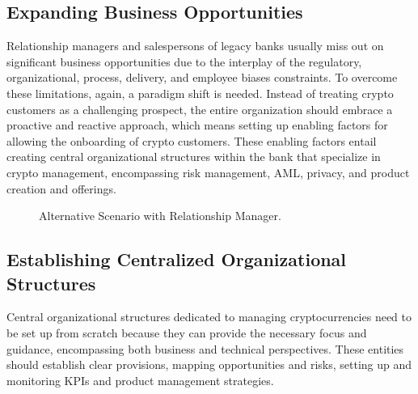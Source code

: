 \documentclass[letterpaper,10pt,english]{jupyterBook}
\let\sphinxpxdimen\pdfpxdimen\else\newdimen\sphinxpxdimen
\begin{document}
\subsection{Expanding Business Opportunities}
\label{\detokenize{LEGACY/legacy:expanding-business-opportunities}}
\sphinxAtStartPar
Relationship managers and salespersons of legacy banks usually miss out on significant business opportunities due to the interplay of the regulatory, organizational, process, delivery, and employee biases constraints. To overcome these limitations, again, a paradigm shift is needed. Instead of treating crypto customers as a challenging prospect, the entire organization should embrace a proactive and reactive approach, which means setting up enabling factors for allowing the onboarding of crypto customers. These enabling factors entail creating central organizational structures within the bank that specialize in crypto management, encompassing risk management, AML, privacy, and product creation and offerings.

\begin{figure}[htbp]
\centering
\capstart

\noindent\sphinxincludegraphics[width=750\sphinxpxdimen,height=400\sphinxpxdimen]{{legacy2}.png}
\caption{Alternative Scenario with Relationship Manager.}\label{\detokenize{LEGACY/legacy:legacy2}}\end{figure}


\subsection{Establishing Centralized Organizational Structures}
\label{\detokenize{LEGACY/legacy:establishing-centralized-organizational-structures}}
\sphinxAtStartPar
Central organizational structures dedicated to managing cryptocurrencies need to be set up from scratch because they can provide the necessary focus and guidance, encompassing both business and technical perspectives. These entities should establish clear provisions, mapping opportunities and risks, setting up and monitoring KPIs and product management strategies.
\end{document}
